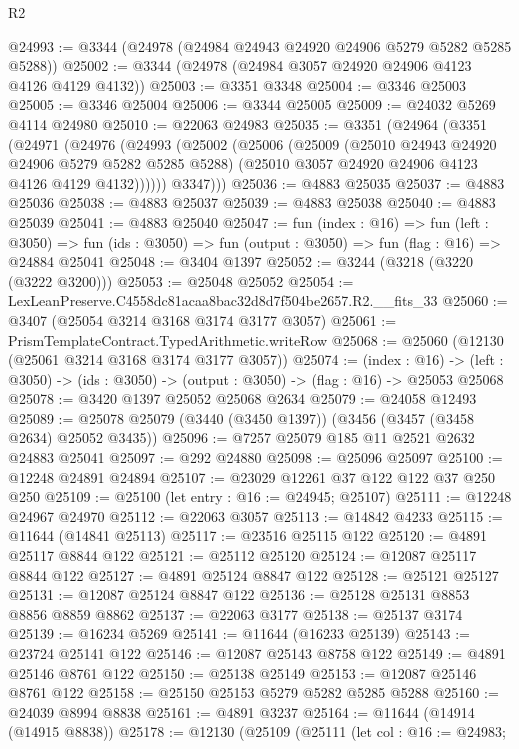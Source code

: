 \begin{lexlean}{R2}
\begin{coremodule}
@24993 := @3344 (@24978 (@24984 @24943 @24920 @24906 @5279 @5282 @5285 @5288))
@25002 := @3344 (@24978 (@24984 @3057 @24920 @24906 @4123 @4126 @4129 @4132))
@25003 := @3351 @3348
@25004 := @3346 @25003
@25005 := @3346 @25004
@25006 := @3344 @25005
@25009 := @24032 @5269 @4114 @24980
@25010 := @22063 @24983
@25035 := @3351
    (@24964
      (@3351
        (@24971
          (@24976
            (@24993
              (@25002
                (@25006
                  (@25009
                    (@25010 @24943 @24920 @24906 @5279 @5282 @5285 @5288)
                    (@25010 @3057 @24920 @24906 @4123 @4126 @4129 @4132))))))
          @3347)))
@25036 := @4883 @25035
@25037 := @4883 @25036
@25038 := @4883 @25037
@25039 := @4883 @25038
@25040 := @4883 @25039
@25041 := @4883 @25040
@25047 := fun (index : @16) =>
  fun (left : @3050) =>
  fun (ids : @3050) => fun (output : @3050) => fun (flag : @16) => @24884 @25041
@25048 := @3404 @1397
@25052 := @3244 (@3218 (@3220 (@3222 @3200)))
@25053 := @25048 @25052
@25054 := LexLeanPreserve.C4558dc81acaa8bac32d8d7f504be2657.R2.__fits_33
@25060 := @3407 (@25054 @3214 @3168 @3174 @3177 @3057)
@25061 := PrismTemplateContract.TypedArithmetic.writeRow
@25068 := @25060 (@12130 (@25061 @3214 @3168 @3174 @3177 @3057))
@25074 := (index : @16) ->
  (left : @3050) -> (ids : @3050) -> (output : @3050) -> (flag : @16) -> @25053 @25068
@25078 := @3420 @1397 @25052 @25068 @2634
@25079 := @24058 @12493
@25089 := @25078 @25079 (@3440 (@3450 @1397)) (@3456 (@3457 (@3458 @2634) @25052 @3435))
@25096 := @7257 @25079 @185 @11 @2521 @2632 @24883 @25041
@25097 := @292 @24880
@25098 := @25096 @25097
@25100 := @12248 @24891 @24894
@25107 := @23029 @12261 @37 @122 @122 @37 @250 @250
@25109 := @25100 (let entry : @16 := @24945; @25107)
@25111 := @12248 @24967 @24970
@25112 := @22063 @3057
@25113 := @14842 @4233
@25115 := @11644 (@14841 @25113)
@25117 := @23516 @25115 @122
@25120 := @4891 @25117 @8844 @122
@25121 := @25112 @25120
@25124 := @12087 @25117 @8844 @122
@25127 := @4891 @25124 @8847 @122
@25128 := @25121 @25127
@25131 := @12087 @25124 @8847 @122
@25136 := @25128 @25131 @8853 @8856 @8859 @8862
@25137 := @22063 @3177
@25138 := @25137 @3174
@25139 := @16234 @5269
@25141 := @11644 (@16233 @25139)
@25143 := @23724 @25141 @122
@25146 := @12087 @25143 @8758 @122
@25149 := @4891 @25146 @8761 @122
@25150 := @25138 @25149
@25153 := @12087 @25146 @8761 @122
@25158 := @25150 @25153 @5279 @5282 @5285 @5288
@25160 := @24039 @8994 @8838
@25161 := @4891 @3237
@25164 := @11644 (@14914 (@14915 @8838))
@25178 := @12130
    (@25109
      (@25111
        (let col : @16 := @24983;

\end{coremodule}
\end{lexlean}
